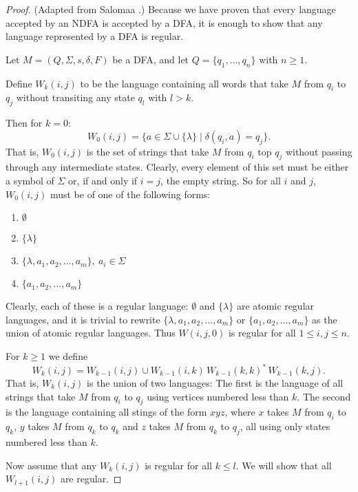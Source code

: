 \documentclass{bcthesis}
\newcommand{\footcite}[2]{\xspace\cite[pg.~{#2}]{#1}\xspace}
\begin{document}
	\begin{proof}
		(Adapted from Salomaa \footcite{salomaa}{29}.)
		Because we have proven that every language accepted by an NDFA is accepted by a DFA, it is enough to show that any language represented by a DFA is regular.

		Let $M = (Q, \Sigma, s, \delta, F)$ be a DFA, and let $Q = \{ q_1, \dots, q_n \}$ with $n \geq 1$.

		Define $W_k(i, j)$ to be the language containing all words that take $M$ from $q_i$ to $q_j$ without transiting any state $q_l$ with $l > k$.

		Then for $k = 0$:
		\[
			W_0(i, j) = \{ a \in \Sigma \cup \{ \lambda \} \mid \delta(q_i, a) = q_j \}.
		\]
		That is, $W_0(i, j)$ is the set of strings that take $M$ from $q_i$ top $q_j$ without passing through any intermediate states.
		Clearly, every element of this set must be either a symbol of $\Sigma$ or, if and only if $i = j$, the empty string.
		So for all $i$ and $j$, $W_0(i, j)$ must be of one of the following forms:
		\begin{enumerate}[label=(\roman*), itemsep = -0.3 ex, nolistsep]
			\item $\emptyset$
			\item $\{ \lambda \}$
			\item $\{ \lambda, a_1, a_2, \dots, a_m \},\ a_i \in \Sigma$
			\item $\{ a_1, a_2, \dots, a_m \}$
		\end{enumerate}
		Clearly, each of these is a regular language:
		$\emptyset$ and $\{ \lambda \}$ are atomic regular languages, and it is trivial to rewrite $\{ \lambda, a_1, a_2, \dots, a_m \}$ or $\{ a_1, a_2, \dots, a_m \}$ as the union of atomic regular languages.
		Thus $W(i, j, 0)$ is regular for all $1 \leq i, j \leq n$.

		For $k \geq 1$ we define
		\[
			W_k(i, j) = W_{k-1}(i, j) \cup W_{k-1}(i, k)\, W_{k-1}(k, k)^*\, W_{k-1}(k, j).
		\]
		That is, $W_k(i, j)$ is the union of two languages:
		The first is the language of all strings that take $M$ from $q_i$ to $q_j$ using vertices numbered less than $k$.
		The second is the language containing all stings of the form $xyz$, where $x$ takes $M$ from $q_i$ to $q_k$, $y$ takes $M$ from $q_k$ to $q_k$ and $z$ takes $M$ from $q_k$ to $q_j$, all using only states numbered less than $k$.

		Now assume that any $W_k(i, j)$ is regular for all $k \leq l$.
		We will show that all $W_{l+1}(i, j)$ are regular.


\end{proof}
\end{document}
